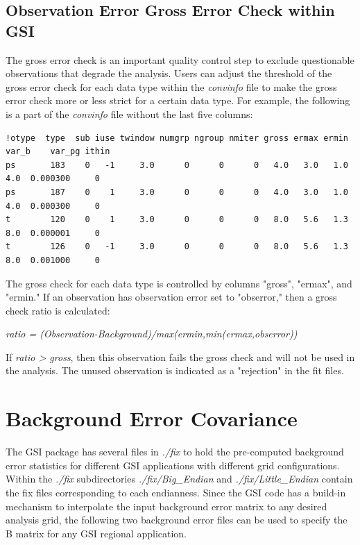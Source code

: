 \subsection{Observation Error Gross Error Check within GSI}

The gross error check is an important quality control step to exclude questionable observations that degrade the analysis. Users can adjust the threshold of the gross error check for each data type within the \textit{convinfo} file to make the gross error check more or less strict for a certain data type. For example, the following is a part of the \textit{convinfo} file without the last five columns:

\begin{scriptsize}
\begin{verbatim}
!otype  type  sub iuse twindow numgrp ngroup nmiter gross ermax ermin var_b    var_pg ithin
ps       183    0   -1     3.0      0      0      0   4.0   3.0   1.0   4.0  0.000300     0
ps       187    0    1     3.0      0      0      0   4.0   3.0   1.0   4.0  0.000300     0
t        120    0    1     3.0      0      0      0   8.0   5.6   1.3   8.0  0.000001     0
t        126    0   -1     3.0      0      0      0   8.0   5.6   1.3   8.0  0.001000     0
\end{verbatim}
\end{scriptsize}
 
The gross check for each data type is controlled by columns "gross", "ermax", and "ermin." If an observation has observation error set to "obserror," then a gross check ratio is calculated:

\textit{ratio = (Observation-Background)/max(ermin,min(ermax,obserror))}

If \textit{ratio > gross}, then this observation fails the gross check and will not be used in the analysis. The unused observation is indicated as a "rejection" in the fit files.

\section{Background Error Covariance}
\label{sec4.8}

The GSI package has several files in \textit{./fix} to hold the pre-computed background error statistics for different GSI applications with different grid configurations. Within the \textit{./fix} subdirectories \textit{./fix/Big\_Endian} and \textit{./fix/Little\_Endian} contain the fix files corresponding to each endianness. Since the GSI code has a build-in mechanism to interpolate the input background error matrix to any desired analysis grid, the following two background error files can be used to specify the B matrix for any GSI regional application.

